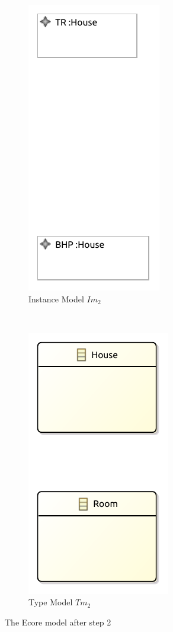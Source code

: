 \begin{figure}[p]
    \centering
    \begin{subfigure}{0.98\textwidth}
        \centering
        \includegraphics{images/06_application/instance_model/step02.pdf}
        \caption{Instance Model $Im_2$}
        \label{fig:application:building_the_model:the_room_class:ecore:instance_model}
    \end{subfigure}
    \\
    \begin{subfigure}{0.98\textwidth}
        \centering
        \includegraphics{images/06_application/type_model/step02.pdf}
        \caption{Type Model $Tm_2$}
        \label{fig:application:building_the_model:the_room_class:ecore:type_model}
    \end{subfigure}
    \caption{The Ecore model after step 2}
    \label{fig:application:building_the_model:the_room_class:ecore}
\end{figure}

